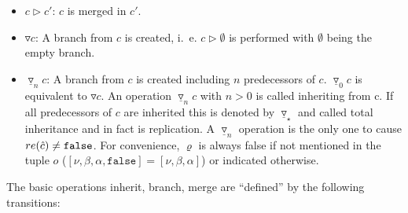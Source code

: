 \documentclass[fleqn, 10pt, a4paper]{report}
\begin{document}
\begin{itemize}
\item $c \rhd c'$: $c$ is merged in $c'$.
\item $\triangledown c$: A branch from $c$ is created, i.~e. $c \rhd \emptyset$
is performed with $\emptyset$ being the empty branch.
\item $\underline\triangledown_n c$: A branch from $c$ is created including $n$
predecessors of $c$. $\underline\triangledown_0 c$ is equivalent to
$\triangledown c$.
An operation $\underline\triangledown_n c$ with $n>0$ is called inheriting from c.
If all predecessors of $c$ are inherited this is denoted
by $\underline\triangledown_\star$
and called total inheritance and in fact is replication. A
$\underline\triangledown_n$ operation is the only one to cause
$\mathnormal{re}(\hat c)\neq \mathtt{false}$. For convenience,
$\varrho$ is always false if not mentioned in the tuple $o$ ($[\nu, \beta, \alpha,
\mathtt{false}]=[\nu, \beta, \alpha]$)
or indicated otherwise.
\end{itemize}

The basic operations inherit, branch, merge are ``defined'' by the
following transitions:	
\end{document}
